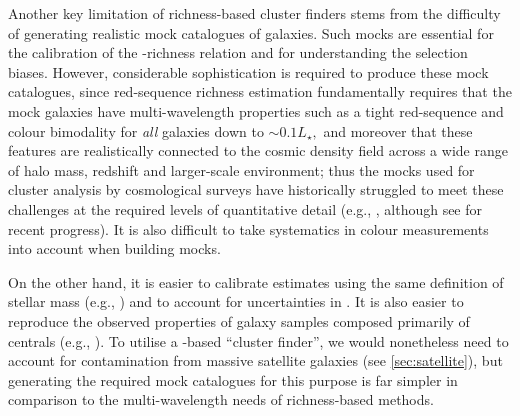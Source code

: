 \documentclass[fleqn,usenatbib,useAMS]{mnras}
\begin{document}
    Another key limitation of richness-based cluster finders stems from the difficulty of
    generating realistic mock catalogues of galaxies. 
    Such mocks are essential for the calibration of the \mvir{}-richness relation and for
    understanding the selection biases.
    However, considerable sophistication is required to produce these mock catalogues, since
    red-sequence richness estimation fundamentally requires that the mock galaxies have
    multi-wavelength properties such as a tight red-sequence and colour bimodality for {\em all}
    galaxies down to $\sim0.1L_{\star},$ and moreover that these features are realistically
    connected to the cosmic density field across a wide range of halo mass, redshift and
    larger-scale environment; thus the mocks used for cluster analysis by cosmological surveys have
    historically struggled to meet these challenges at the required levels of quantitative detail
    (e.g., \citealt{Trayford2015, Trayford2017, Nelson2018, DeRose2019}, although see
    \citealt{Hearin2020, DeRose2021} for recent progress). 
    It is also difficult to take systematics in colour measurements into account when building
    mocks.

    On the other hand, it is easier to calibrate \mstar{} estimates using the same definition of
    stellar mass (e.g., \citealt{Ardila2021}) and to account for uncertainties in \mstar{}. 
    It is also easier to reproduce the observed properties of galaxy samples composed primarily of
    centrals (e.g., \citealt{Moster2020}).
    To utilise a \mstar{}-based ``cluster finder'', we would nonetheless need to account for
    contamination from massive satellite galaxies (see \ref{sec:satellite}), but generating the
    required mock catalogues for this purpose is far simpler in comparison to the multi-wavelength
    needs of richness-based methods.  
    
\end{document}
